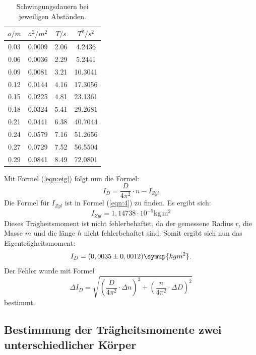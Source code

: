\begin{table}[H]
 \centering
 \caption{Schwingungsdauern bei jeweiligen Abständen.}
 \label{tab:data2}
 \begin{tabular}{c c c c }
   \toprule $a/ m$ & $a^2/ m^2$ & $T / s$ & $T^2/ s^2$ \\
   \midrule
   0.03 & 0.0009 & 2.06 &  4.2436\\
   0.06 & 0.0036 & 2.29 &  5.2441\\
   0.09 & 0.0081 & 3.21 &  10.3041\\
   0.12 & 0.0144 & 4.16 &  17.3056\\
   0.15 & 0.0225 & 4.81 &  23.1361\\
   0.18 & 0.0324 & 5.41 &  29.2681\\
   0.21 & 0.0441 & 6.38 &  40.7044\\
   0.24 & 0.0579 & 7.16 &  51.2656\\
   0.27 & 0.0729 & 7.52 &  56.5504\\
   0.29 & 0.0841 & 8.49 &  72.0801\\
   \bottomrule
 \end{tabular}
\end{table}
\newpage
Mit Formel (\ref{eqn:eig}) folgt nun die Formel:
\begin{equation}
  I_D = \frac{D}{4 \pi ^2}\cdot n - I_{Zyl}
\end{equation}
Die Formel für $I_{Zyl}$ ist in Formel (\ref{eqn:4}) zu finden.
Es ergibt sich:
\begin{equation*}
  I_{Zyl} = 1,14738 \cdot 10^{-5} \mathrm{kg\, m^2}
\end{equation*}
Dieses Trägheitsmoment ist nicht fehlerbehaftet, da der gemessene Radius $r$,
die Masse $m$ und die länge $h$ nicht fehlerbehaftet sind.
Somit ergibt sich nun das Eigenträgheitsmoment:
\begin{equation*}
 I_D = (0,0035\pm 0,0012) \symup{kg m^2} .
\end{equation*}
Der Fehler wurde mit Formel
\begin{equation}
  \Delta I_D = \sqrt{\left(\frac{D}{4\pi ^2}\cdot \Delta n \right)^2+
  \left(\frac{n}{4\pi ^2}\cdot \Delta D\right)^2}
\end{equation}
bestimmt.
\subsection{Bestimmung der Trägheitsmomente zwei unterschiedlicher Körper}
